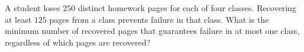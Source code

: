 A student loses $250$ distinct homework pages for each of four classes. Recovering at least $125$ pages from a class prevents failure in that class. What is the minimum number of recovered pages that guarantees failure in at most one class, regardless of which pages are recovered?
